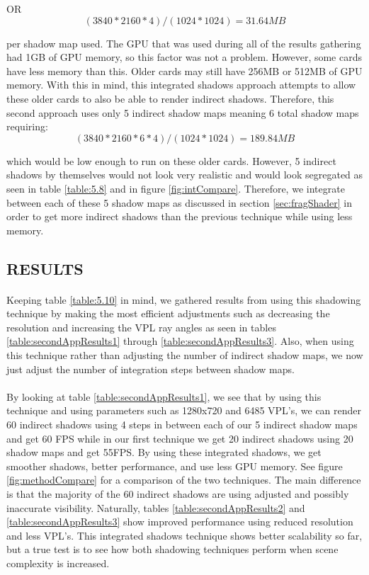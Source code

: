 OR
\begin{equation}
(3840*2160*4)/(1024*1024) = 31.64 MB
\end{equation}

per shadow map used.  The GPU that was used during all of the results gathering had 1GB of GPU memory, so this factor was not a problem.  However, some cards have less memory than this.  Older cards may still have 256MB or 512MB of GPU memory.  With this in mind, this integrated shadows approach attempts to allow these older cards to also be able to render indirect shadows.  Therefore, this second approach uses only 5 indirect shadow maps meaning 6 total shadow maps requiring:
\begin{equation}
(3840*2160*6*4)/(1024*1024) = 189.84 MB
\end{equation}

which would be low enough to run on these older cards.  However, 5 indirect shadows by themselves would not look very realistic and would look segregated as seen in table \ref{table:5.8} and in figure \ref{fig:intCompare}.  Therefore, we integrate between each of these 5 shadow maps as discussed in section \ref{sec:fragShader} in order to get more indirect shadows than the previous technique while using less memory.

\subsection{RESULTS}
\paragraph{}
Keeping table \ref{table:5.10} in mind, we gathered results from using this shadowing technique by making the most efficient adjustments such as decreasing the resolution and increasing the VPL ray angles as seen in tables \ref{table:secondAppResults1} through \ref{table:secondAppResults3}.  Also, when using this technique rather than adjusting the number of indirect shadow maps, we now just adjust the number of integration steps between shadow maps.

\paragraph{}
By looking at table \ref{table:secondAppResults1}, we see that by using this technique and using parameters such as 1280x720 and 6485 VPL's, we can render 60 indirect shadows using 4 steps in between each of our 5 indirect shadow maps and get 60 FPS while in our first technique we get 20 indirect shadows using 20 shadow maps and get 55FPS.  By using these integrated shadows, we get smoother shadows, better performance, and use less GPU memory.  See figure \ref{fig:methodCompare} for a comparison of the two techniques.  The main difference is that the majority of the 60 indirect shadows are using adjusted and possibly inaccurate visibility.  Naturally, tables \ref{table:secondAppResults2} and \ref{table:secondAppResults3} show improved performance using reduced resolution and less VPL's.  This integrated shadows technique shows better scalability so far, but a true test is to see how both shadowing techniques perform when scene complexity is increased.


